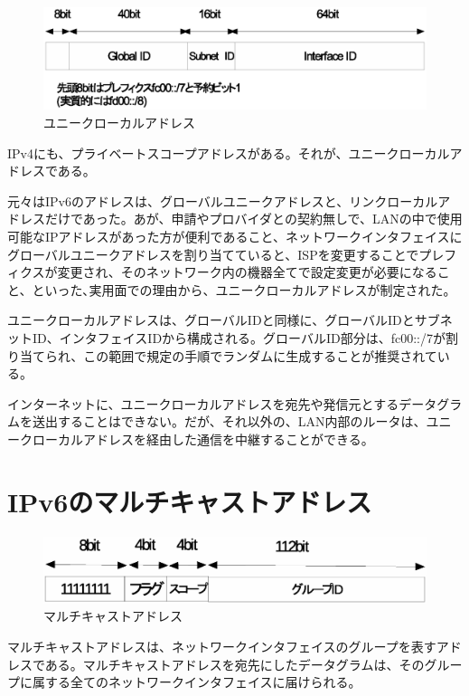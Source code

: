 \begin{figure}[htbp]
	\includegraphics[width=12cm,clip]{draw/ula.eps}
	\caption{ユニークローカルアドレス}
	\label{fig:ula}
\end{figure}

IPv4にも、プライベートスコープアドレスがある。それが、ユニークローカルアドレスである。

元々はIPv6のアドレスは、グローバルユニークアドレスと、リンクローカルアドレスだけであった。あが、申請やプロバイダとの契約無しで、LANの中で使用可能なIPアドレスがあった方が便利であること、ネットワークインタフェイスにグローバルユニークアドレスを割り当てていると、ISPを変更することでプレフィクスが変更され、そのネットワーク内の機器全てで設定変更が必要になること、といった､実用面での理由から、ユニークローカルアドレスが制定された。

ユニークローカルアドレスは、グローバルIDと同様に、グローバルIDとサブネットID、インタフェイスIDから構成される。グローバルID部分は、fc00::/7が割り当てられ、この範囲で規定の手順でランダムに生成することが推奨されている。

インターネットに、ユニークローカルアドレスを宛先や発信元とするデータグラムを送出することはできない。だが、それ以外の、LAN内部のルータは、ユニークローカルアドレスを経由した通信を中継することができる。

\section{IPv6のマルチキャストアドレス}

\begin{figure}[htbp]
	\includegraphics[width=12cm,clip]{draw/6multicast.eps}
	\caption{マルチキャストアドレス}
	\label{fig:6multicastaddr}
\end{figure}
マルチキャストアドレスは、ネットワークインタフェイスのグループを表すアドレスである。マルチキャストアドレスを宛先にしたデータグラムは、そのグループに属する全てのネットワークインタフェイスに届けられる。

